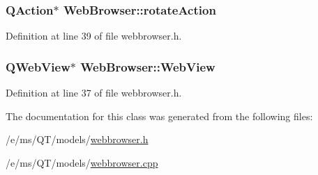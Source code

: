 \hypertarget{classWebBrowser_a72affcc10a896cc9684c6187058077b8}{
\subsubsection[{rotateAction}]{\setlength{\rightskip}{0pt plus 5cm}QAction$\ast$ {\bf WebBrowser::rotateAction}}}
\label{classWebBrowser_a72affcc10a896cc9684c6187058077b8}


Definition at line 39 of file webbrowser.h.

\hypertarget{classWebBrowser_aca7125e85b1c317dc6e49e7aa76ec87f}{
\subsubsection[{WebView}]{\setlength{\rightskip}{0pt plus 5cm}QWebView$\ast$ {\bf WebBrowser::WebView}}}
\label{classWebBrowser_aca7125e85b1c317dc6e49e7aa76ec87f}


Definition at line 37 of file webbrowser.h.



The documentation for this class was generated from the following files:\begin{DoxyCompactItemize}
\item 
/e/ms/QT/models/\hyperlink{webbrowser_8h}{webbrowser.h}\item 
/e/ms/QT/models/\hyperlink{webbrowser_8cpp}{webbrowser.cpp}\end{DoxyCompactItemize}

